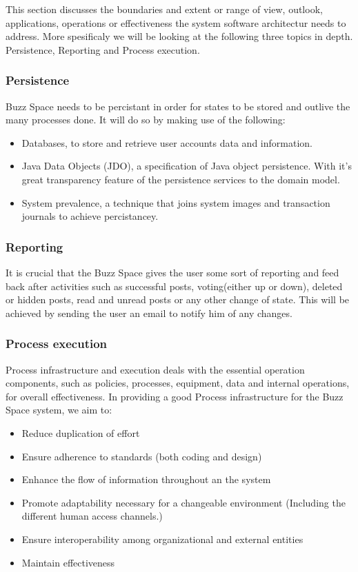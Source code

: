 This section discusses the boundaries and extent or range of view, outlook, applications, operations or effectiveness the system software architectur needs to address. 
More spesificaly we will be looking at the following three topics in depth. Persistence, Reporting and Process execution.

\subsubsection{Persistence}
	Buzz Space needs to be percistant in order for states to be stored and outlive the many
	processes done. It will do so by making use of the following:

		\begin{itemize}
			\item Databases, to store and retrieve user accounts data and information.
			\item Java Data Objects (JDO), a specification of Java object persistence. With it's great
			 transparency feature of the persistence services to the domain model.
			\item System prevalence, a technique that joins system images and transaction journals to achieve percistancey.
		\end{itemize}
	
	\subsubsection{Reporting}
	It is crucial that the Buzz Space gives the user some sort of reporting and feed back after activities such as successful posts, voting(either up or down), deleted or hidden posts, read and unread posts or any other change of state. This will be achieved by sending the user an email to notify him of any changes. 
	
			 
	\subsubsection{Process execution}
	Process infrastructure and execution deals with the essential operation components, such as policies, processes, equipment, data and internal operations, for overall effectiveness. In providing a good Process infrastructure for the Buzz Space system, we aim to:
	\begin{itemize}
  \item	Reduce duplication of effort
  \item	Ensure adherence to standards (both coding and design)
  \item	Enhance the flow of information throughout an the system
  \item	Promote adaptability necessary for a changeable environment (Including the different human access channels.)
  \item	Ensure interoperability among organizational and external entities
  \item	Maintain effectiveness
	\end{itemize}

						
